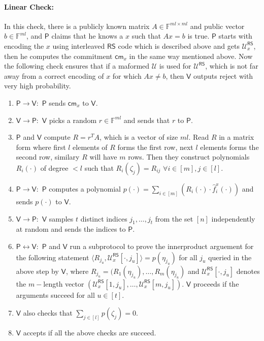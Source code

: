\documentclass[runningheads]{llncs}
\newcommand{\innp}[2]{\langle #1,#2\rangle}
\def\prover{\mathsf{P}}
\def\verifier{\mathsf{V}}
\def\RS{\mathsf{RS}} %
\def\cm{\mathsf{cm}} %
\def\oracle{\mathcal{U}^{\RS}}
\def\calU{\mathcal{U}}
\def\bbF{\mathbb{F}}
\begin{document}
	\paragraph{\textbf{Linear Check:}}\label{sec: linearity} In this check, there is a publicly known matrix $A \in \bbF^{ml\times ml}$ and public vector $b\in \bbF^{ml}$, and $\prover$ claims that he knows a $x$ such that $Ax=b$ is true. $\prover$ starts with encoding the $x$ using interleaved $\RS$ code which is described above and gets $\oracle_x$, then he computes the commitment $\cm_x$ in the same way mentioned above. Now the following check ensures that if a maformed $\calU$ is used for $\oracle$, which is not far away from a correct encoding of $x$ for which $Ax\neq b$, then $\verifier$ outputs reject with very high probability.
	\begin{enumerate}
		\item $\prover \rightarrow \verifier: $ $\prover$ sends $\cm_x$ to $\verifier$.
		\item $\verifier \rightarrow \prover: $ $\verifier$ picks a random $r\in \bbF^{ml}$ and sends that $r$ to $\prover$.
		\item $\prover$ and $\verifier$ compute $R=r^TA$, which is a vector of size $ml$. Read $R$ in a matrix form where first $l$ elements of $R$ forms the first row, next $l$ elements forms the second row, similary $R$ will have $m$ rows. Then they construct polynomials $R_i(\cdot)$ of degree $<l$ such that $R_i(\zeta_j)=R_{ij}$ $\forall i\in [m], j\in [l]$. 
		\item $\prover \rightarrow \verifier: $  $\prover$ computes a polynomial $p(\cdot)=\sum_{i\in[m]} ( R_i(\cdot)\cdot \hat{f}^x_i(\cdot))$ and sends $p(\cdot)$ to $\verifier$.
		\item $\verifier \rightarrow \prover: $ $\verifier$ samples $t$ distinct  indices $j_1,\ldots,j_t$ from the set $[n]$ independently at random and sends the indices to $\prover$.
		\item $\prover \leftrightarrow \verifier: $ $\prover$ and $\verifier$ run a subprotocol to prove the innerproduct arguement for the following statement $\innp{R_{j_u}}{\oracle_x[\cdot,j_u]} = p(\eta_{j_u})$ for all $j_u$ queried in the above step by $\verifier$, where $R_{j_u}=(R_1(\eta_{j_u}),\ldots,R_m(\eta_{j_u})$ and $\oracle_x[\cdot,j_u]$ denotes the $m-$length vector $(\oracle_x[1,j_u],\ldots, \oracle_x[m,j_u])$. $\verifier$ proceeds if the arguments succeed for all $u \in [t]$.
		\item $\verifier$ also checks that $\sum_{j\in[l]} p(\zeta_j)=0$.
		\item $\verifier$ accepts if all the above checks are succeed.	  
	\end{enumerate}
	
\end{document}
